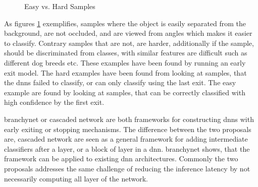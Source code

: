 \begin{figure}
	\captionsetup[subfigure]{justification=centering}
	\centering
	\caption[Easy vs. Hard Samples]{Easy vs. Hard Samples}
	\label{fig:hardvseasydog}
\end{figure}

As figures \ref{fig:hardvseasydog} exemplifies, samples where the object is easily separated from the background, are not occluded, and are viewed from angles which makes it easier to classify. Contrary samples that are not, are harder, additionally if the sample, should be discriminated from classes, with similar features are difficult such as different dog breeds etc. These examples have been found by running an early exit model. The hard examples have been found from looking at samples, that the \gls{dnn}s failed to classify, or can only classify using the last exit. The easy example are found by looking at samples, that can be correctly classified with high confidence by the first exit. 

\gls{branchynet} \cite{teerapittayanon_branchynet:_2016} or cascaded network \cite{leroux_resource-constrained_2015} are both frameworks for constructing \gls{dnn}s with early exiting or stopping mechanisms. The difference between the two proposals are, cascaded network are seen as a general framework for adding intermediate classifiers after a layer, or a block of layer in a \gls{dnn}. \gls{branchynet} shows, that the framework can be applied to existing \gls{dnn} architectures. Commonly the two proposals addresses the same challenge of reducing the inference latency by not necessarily computing all layer of the network.

